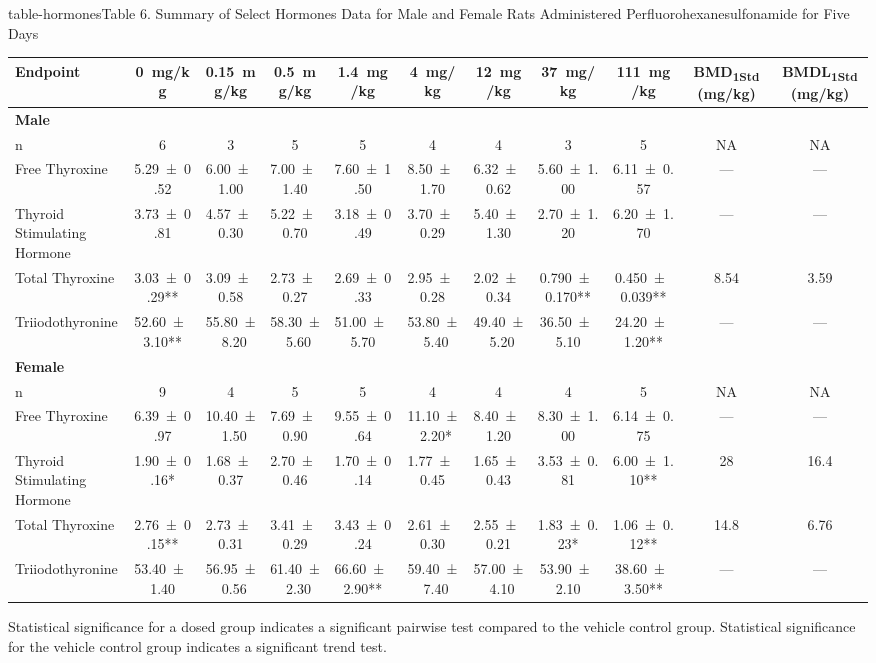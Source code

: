 \begin{landscape}
\begin{niehstable}{table-hormones}{Table 6. Summary of Select Hormones Data for Male and Female Rats Administered Perfluorohexanesulfonamide for Five Days}
\begin{tabular}{lcccccccccc}
\toprule
Endpoint & 0~mg/kg & 0.15~mg/kg & 0.5~mg/kg & 1.4~mg/kg & 4~mg/kg & 12~mg/kg & 37~mg/kg & 111~mg/kg & BMD\textsubscript{1Std} (mg/kg) & BMDL\textsubscript{1Std} (mg/kg) \\
\midrule
\multicolumn{11}{l}{\textbf{Male}} \\
n & 6 & 3 & 5 & 5 & 4 & 4 & 3 & 5 & NA & NA \\
Free Thyroxine & 5.29 ± 0.52 & 6.00 ± 1.00 & 7.00 ± 1.40 & 7.60 ± 1.50 & 8.50 ± 1.70 & 6.32 ± 0.62 & 5.60 ± 1.00 & 6.11 ± 0.57 & — & — \\
Thyroid Stimulating Hormone & 3.73 ± 0.81 & 4.57 ± 0.30 & 5.22 ± 0.70 & 3.18 ± 0.49 & 3.70 ± 0.29 & 5.40 ± 1.30 & 2.70 ± 1.20 & 6.20 ± 1.70 & — & — \\
Total Thyroxine & 3.03 ± 0.29** & 3.09 ± 0.58 & 2.73 ± 0.27 & 2.69 ± 0.33 & 2.95 ± 0.28 & 2.02 ± 0.34 & 0.790 ± 0.170** & 0.450 ± 0.039** & 8.54 & 3.59 \\
Triiodothyronine & 52.60 ± 3.10** & 55.80 ± 8.20 & 58.30 ± 5.60 & 51.00 ± 5.70 & 53.80 ± 5.40 & 49.40 ± 5.20 & 36.50 ± 5.10 & 24.20 ± 1.20** & — & — \\
\multicolumn{11}{l}{\textbf{Female}} \\
n & 9 & 4 & 5 & 5 & 4 & 4 & 4 & 5 & NA & NA \\
Free Thyroxine & 6.39 ± 0.97 & 10.40 ± 1.50 & 7.69 ± 0.90 & 9.55 ± 0.64 & 11.10 ± 2.20* & 8.40 ± 1.20 & 8.30 ± 1.00 & 6.14 ± 0.75 & — & — \\
Thyroid Stimulating Hormone & 1.90 ± 0.16* & 1.68 ± 0.37 & 2.70 ± 0.46 & 1.70 ± 0.14 & 1.77 ± 0.45 & 1.65 ± 0.43 & 3.53 ± 0.81 & 6.00 ± 1.10** & 28 & 16.4 \\
Total Thyroxine & 2.76 ± 0.15** & 2.73 ± 0.31 & 3.41 ± 0.29 & 3.43 ± 0.24 & 2.61 ± 0.30 & 2.55 ± 0.21 & 1.83 ± 0.23* & 1.06 ± 0.12** & 14.8 & 6.76 \\
Triiodothyronine & 53.40 ± 1.40 & 56.95 ± 0.56 & 61.40 ± 2.30 & 66.60 ± 2.90** & 59.40 ± 7.40 & 57.00 ± 4.10 & 53.90 ± 2.10 & 38.60 ± 3.50** & — & — \\
\bottomrule
\end{tabular}
\begin{tablenotes}
\item Statistical significance for a dosed group indicates a significant pairwise test compared to the vehicle control group. Statistical significance for the vehicle control group indicates a significant trend test.

\end{tablenotes}
\end{niehstable}
\end{landscape}
